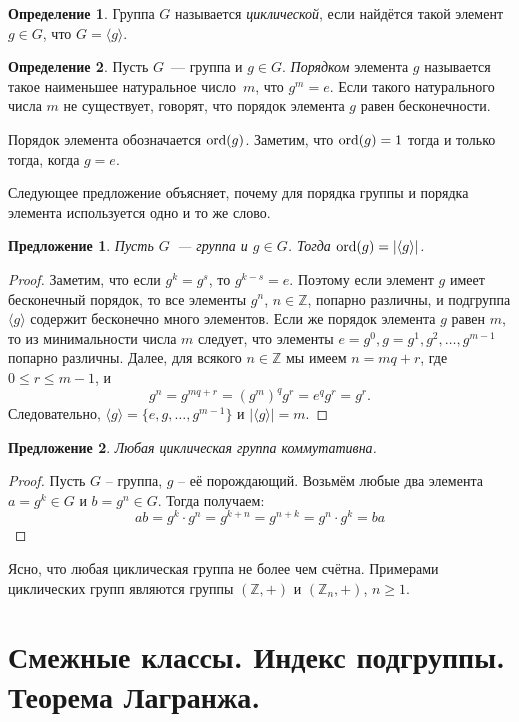 \documentclass[a4paper, 12pt]{article}
\def\ZZ{{\mathbb Z}}%
\def\ord{{\rm ord}}%
\def\ord{{\rm ord}}
\def\ord{{\rm ord}}
\newtheorem{proposition}{Предложение}
\theoremstyle{definition}
\newtheorem{definition}{Определение}
\theoremstyle{remark}
\begin{document}
\begin{definition}
Группа $G$ называется {\it циклической}, если найдётся такой элемент
$g\in G$, что $G=\langle g\rangle$.
\end{definition}

\begin{definition}
Пусть $G$~--- группа и $g\in G$. {\it Порядком} элемента $g$
называется такое наименьшее натуральное число~$m$, что $g^m=e$. 
Если
такого натурального числа $m$ не существует, говорят, что порядок
элемента $g$ равен бесконечности.
\end{definition}

Порядок элемента обозначается $\ord(g)$. 
Заметим, что $\ord(g)=1$ тогда и только тогда, когда $g=e$.

Следующее предложение объясняет, почему для порядка группы и порядка элемента используется одно и то же слово.

\begin{proposition} \label{p1}
Пусть $G$~--- группа и $g\in G$. Тогда $\ord(g)=|\langle g\rangle|$.
\end{proposition}

\begin{proof}
Заметим, что если $g^k=g^s$, то $g^{k-s}=e$. 
Поэтому если элемент
$g$ имеет бесконечный порядок, то все элементы $g^n$, $n\in\ZZ$,
попарно различны, и подгруппа $\langle g\rangle$ содержит бесконечно
много элементов. 
Если же порядок элемента $g$ равен $m$, то из
минимальности числа $m$ следует, что элементы $e=g^0, g=g^1,
g^2,\ldots,g^{m-1}$ попарно различны. 
Далее, для всякого $n\in\ZZ$
мы имеем $n=mq+r$, где $0 \leqslant r \leqslant m-1$, и
$$
g^n=g^{mq+r}=(g^m)^qg^r=e^qg^r=g^r.
$$
Следовательно, $\langle g\rangle=\{e,g,\ldots, g^{m-1}\}$ и
$|\langle g\rangle|=m$.
\end{proof}
\begin{proposition}
    Любая циклическая группа коммутативна.
\end{proposition}
\begin{proof}
    Пусть $G$ -- группа, $g$ -- её порождающий. 
    Возьмём любые два элемента $a = g^k \in G$ и $b = g^n \in G$. Тогда получаем:
    $$
    ab = g^k\cdot g^n = g^{k + n} = g^{n + k} = g^n\cdot g^k = ba
    $$
\end{proof}
Ясно, что любая циклическая группа не более чем
счётна. Примерами циклических групп являются группы $(\ZZ,+)$ и
$(\ZZ_n,+)$, $n \ge 1$.


\section{Смежные классы. Индекс подгруппы. Теорема Лагранжа.}
\end{document}
